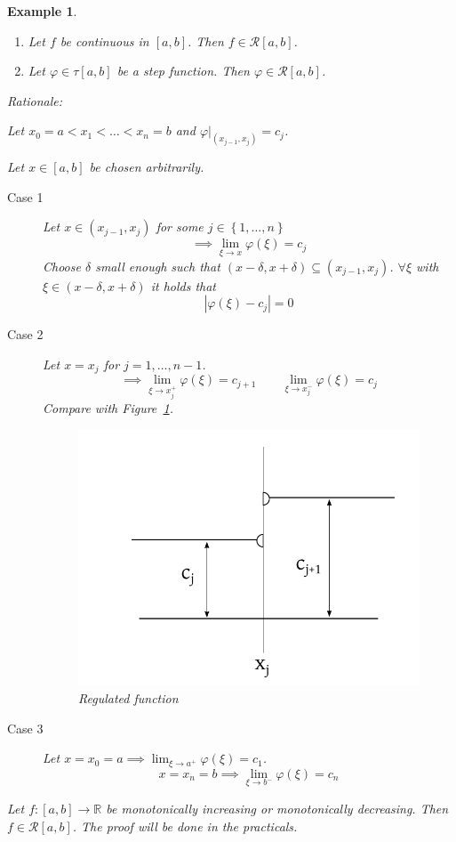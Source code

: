 \documentclass{article}
\newtheorem{example}{Example}  \numberwithin{example}{section}
\newcommand{\set}[1]{\left\{#1\right\}}
\newcommand{\card}[1]{\left|#1\right|}
\begin{document}
\begin{example}
  \begin{enumerate}
    \item Let $f$ be continuous in $[a,b]$. Then $f \in \mathcal R[a,b]$.
    \item Let $\varphi \in \tau[a,b]$ be a step function. Then $\varphi \in \mathcal R[a,b]$.
  \end{enumerate}
  Rationale:

  Let $x_0 = a < x_1 < \dots < x_n = b$ and $\varphi|_{(x_{j-1}, x_j)} = c_j$.

  Let $x \in [a,b]$ be chosen arbitrarily.

  \begin{description}
    \item[Case 1]
      Let $x \in (x_{j-1}, x_j)$ for some $j \in \set{1, \dots, n}$
      \[ \implies \lim_{\xi\to x} \varphi(\xi) = c_j \]
      Choose $\delta$ small enough such that $(x - \delta, x + \delta) \subseteq (x_{j-1}, x_j)$.
      $\forall \xi$ with $\xi \in (x - \delta, x + \delta)$ it holds that
      \[ \card{\varphi(\xi) - c_j} = 0 \]
    \item[Case 2]
      Let $x = x_j$ for $j = 1, \dots, n-1$.
      \[ \implies \lim_{\xi \to x_j^+} \varphi(\xi) = c_{j+1} \qquad \lim_{\xi \to x_j^-} \varphi(\xi) = c_j \]
      Compare with Figure~\ref{img:regf}.
      \begin{figure}
        \begin{center}
          \includegraphics{img/15_regulated_function.pdf}
          \caption{Regulated function}
          \label{img:regf}
        \end{center}
      \end{figure}
    \item[Case 3]
      Let $x = x_0 = a \implies \lim_{\xi \to a^+} \varphi(\xi) = c_1$.
      \[ x = x_n = b \implies \lim_{\xi \to b^-} \varphi(\xi) = c_n \]
  \end{description}

  Let $f: [a,b] \to \mathbb R$ be monotonically increasing or monotonically decreasing.
  Then $f \in \mathcal R[a,b]$. The proof will be done in the practicals.
\end{example}
\end{document}
